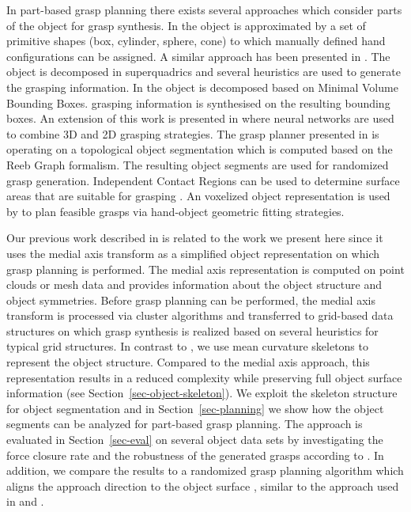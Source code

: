 In part-based grasp planning there exists several approaches which consider parts of the object for grasp synthesis.
In \cite{miller2003} the object is approximated by a set of primitive shapes (box, cylinder, sphere, cone) to which manually defined hand configurations can be assigned. 
A similar approach has been presented in \cite{goldfeder2007}. The object is decomposed in superquadrics and several heuristics are used to generate the grasping information. 
In \cite{huebner2008} the object is decomposed based on Minimal Volume Bounding Boxes. grasping information is synthesised on the resulting bounding boxes. An extension of this work is presented in \cite{geidenstam2009} where neural networks are used to combine 3D and 2D grasping strategies. 
The grasp planner presented in \cite{aleotti2010grasp} is operating on a topological object segmentation which is computed based on the Reeb Graph formalism. The resulting object segments are used for randomized grasp generation. 
Independent Contact Regions can be used to determine surface areas that are suitable for grasping \cite{Roa07}.
An voxelized object representation is used by \cite{Song2016} to plan feasible grasps via hand-object geometric fitting strategies. 

Our previous work described in \cite{pryb2010, przybylski2012} is related to the work we present here since it uses the medial axis transform as a simplified object representation on which grasp planning is performed. The medial axis representation is computed on point clouds or mesh data and provides information about the object structure and object symmetries. Before grasp planning can be performed, the medial axis transform is processed via cluster algorithms and transferred to grid-based data structures on which grasp synthesis is realized based on several heuristics for typical grid structures. In contrast to \cite{przybylski2012}, we use mean curvature skeletons \cite{tagliasacchi2012mean} to represent the object structure.  Compared to the medial axis approach, this representation results in a reduced complexity while preserving full object surface information (see Section~\ref{sec-object-skeleton}). We exploit the skeleton structure for object segmentation and in Section~\ref{sec-planning} we show how the object segments can be analyzed for part-based grasp planning. The approach is evaluated in Section~\ref{sec-eval} on several object data sets by investigating the force closure rate and the robustness of the generated grasps according to \cite{weisz2012pose}. In addition, we compare the results to a randomized grasp planning algorithm which aligns the approach direction to the object surface \cite{Vahrenkamp12b}, similar to the approach used in \cite{Diankov2010} and \cite{Kappler2015}.



